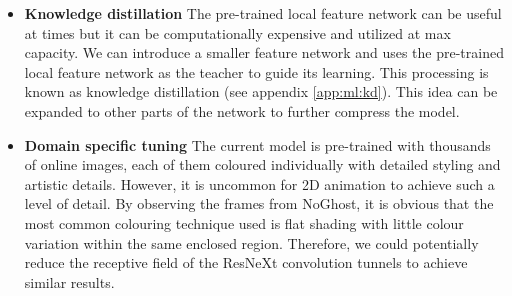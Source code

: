 \begin{itemize}
    \item \textbf{Knowledge distillation} The pre-trained local feature network can be useful at times but it can be computationally expensive and utilized at max capacity. We can introduce a smaller feature network and uses the pre-trained local feature network as the teacher to guide its learning. This processing is known as knowledge distillation (see appendix \ref{app:ml:kd}). This idea can be expanded to other parts of the network to further compress the model.
    \item \textbf{Domain specific tuning} The current model is pre-trained with thousands of online images, each of them coloured individually with detailed styling and artistic details. However, it is uncommon for 2D animation to achieve such a level of detail. By observing the frames from NoGhost, it is obvious that the most common colouring technique used is flat shading with little colour variation within the same enclosed region. Therefore, we could potentially reduce the receptive field of the ResNeXt convolution tunnels to achieve similar results.
\end{itemize}

